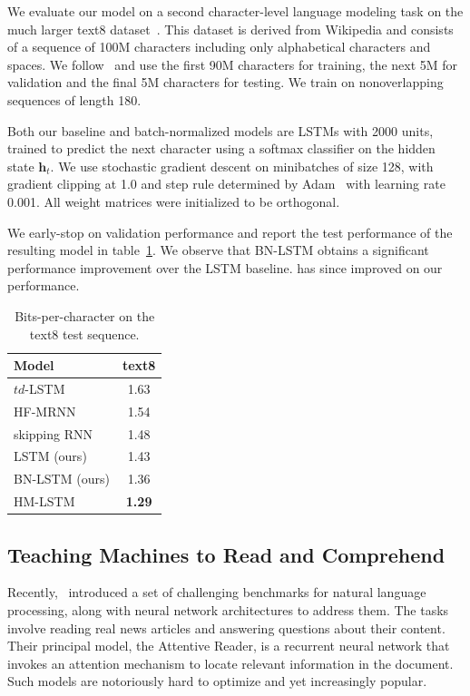 \documentclass{article} %
\newcommand{\vect}[1]{\mathbf{#1}}
\begin{document}
We evaluate our model on a second character-level language modeling task on the
much larger text8 dataset~\citep{mahoney2009large}.  This dataset is derived
from Wikipedia and consists of a sequence of 100M characters including only
alphabetical characters and spaces.  We
follow~\citet{mikolov2012subword,zhang2016architectural} and use the first 90M
characters for training, the next 5M for validation and the final 5M characters
for testing.  We train on nonoverlapping sequences of length 180.

Both our baseline and batch-normalized models are LSTMs with 2000 units,
trained to predict the next character using a softmax classifier on the hidden
state $\vect{h}_t$. We use stochastic gradient descent on minibatches of size
128, with gradient clipping at 1.0 and step rule determined by
Adam~\citep{kingma2014adam} with learning rate 0.001.  All weight matrices were
initialized to be orthogonal.

We early-stop on validation performance and report the test performance of the
resulting model in table~\ref{tab:text8_test}.  We observe that BN-LSTM obtains
a significant performance improvement over the LSTM baseline.
\citet{chung2016hierarchical} has since improved on our performance.

\begin{table}[!hb]
  \center
  \begin{tabular}{@{}lc@{}}
  \toprule
  \bf Model & \bf text8 \\
  \midrule
  $td$-LSTM~\citep{zhang2016architectural} & 1.63 \\
  HF-MRNN~\citep{mikolov2012subword} & 1.54 \\
  skipping RNN~\citep{pachitariu2013regularization} & 1.48 \\
  \midrule
  LSTM (ours) &  1.43 \\
  BN-LSTM (ours) & 1.36 \\
  \midrule
  HM-LSTM~\citep{chung2016hierarchical} & \textbf{1.29} \\
  \bottomrule
\end{tabular}
\caption{Bits-per-character on the text8 test sequence.}
\label{tab:text8_test}
\end{table}

\subsection{Teaching Machines to Read and Comprehend}
\label{sec:less-attr}

Recently,~\citet{attentivereader} introduced a set of challenging benchmarks
for natural language processing, along with neural network architectures to
address them.  The tasks involve reading real news articles and answering
questions about their content.  Their principal model, the Attentive Reader, is
a recurrent neural network that invokes an attention mechanism to locate
relevant information in the document.  Such models are notoriously hard to
optimize and yet increasingly popular.
\end{document}
